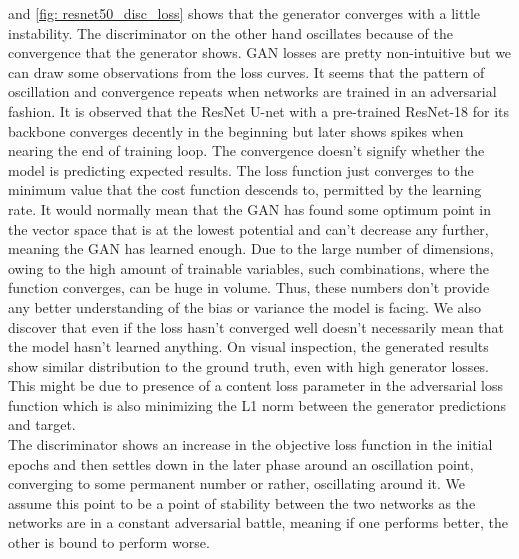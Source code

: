 \documentclass[10pt,twocolumn,letterpaper]{article}
\begin{document}
     and \cref{fig: resnet50_disc_loss} shows that the generator converges with a little instability. The discriminator on the other hand oscillates because of the convergence that the generator shows. GAN losses are pretty non-intuitive but we can draw some observations from the loss curves. It seems that the pattern of oscillation and convergence repeats when networks are trained in an adversarial fashion. It is observed that the ResNet U-net with a pre-trained ResNet-18 for its backbone converges decently in the beginning but later shows spikes when nearing the end of training loop. The convergence doesn't signify whether the model is predicting expected results. The loss function just converges to the minimum value that the cost function descends to, permitted by the learning rate. It would normally mean that the GAN has found some optimum point in the vector space that is at the lowest potential and can't decrease any further, meaning the GAN has learned enough. Due to the large number of dimensions, owing to the high amount of trainable variables, such combinations, where the function converges, can be huge in volume. Thus, these numbers don't provide any better understanding of the bias or variance the model is facing. We also discover that even if the loss hasn't converged well doesn't necessarily mean that the model hasn't learned anything. On visual inspection, the generated results show similar distribution to the ground truth, even with high generator losses. This might be due to presence of a content loss parameter in the adversarial loss function which is also minimizing the L1 norm between the generator predictions and target.\\
    \hspace*{0.167 in}The discriminator shows an increase in the objective loss function in the initial epochs and then settles down in the later phase around an oscillation point, converging to some permanent number or rather, oscillating around it. We assume this point to be a point of stability between the two networks as the networks are in a constant adversarial battle, meaning if one performs better, the other is bound to perform worse.
\end{document}
